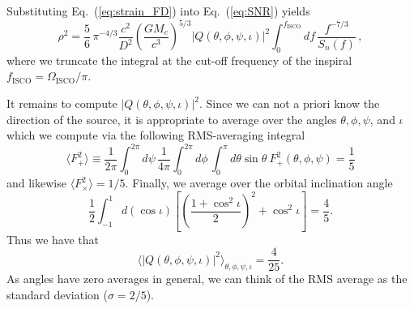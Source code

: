 \documentclass[prd,amsmath,amssymb,aps,floats,amsfonts,notitlepage,superscriptaddress,eqsecnum,nofootinbib,10pt]{revtex4-1}
\newcommand{\f}{\frac}
\newcommand{\be}{\begin{equation}}
\newcommand{\ee}{\end{equation}}
\begin{document}
Substituting Eq.~(\ref{eq:strain_FD}) into Eq.~(\ref{eq:SNR}) yields
%
\be
\rho^2 = \f{5}{6}\, \pi^{-4/3} \f{c^2}{D^2}\left(\f{G M_c}{c^3}\right)^{5/3}|Q(\theta,\phi,\psi,\iota)|^2 \int_0^{f_\text{ISCO}} d f\, \f{f^{-7/3}}{S_n(f)}\, \label{eq:SNR_v2},
\ee
%
where we truncate the integral at the cut-off frequency of the inspiral $f_\text{ISCO}=\Omega_\text{ISCO}/\pi$.

It remains to compute $|Q(\theta,\phi,\psi,\iota)|^2$. 
Since we can not a priori know the direction of the source, it is appropriate to average over the angles $\theta,\phi,\psi$, and $\iota$ which we compute
%
%
via the following RMS-averaging integral
%
\be
\langle F^2_{+}\rangle \equiv \f{1}{2\pi}\int_0^{2\pi}d\psi \,\f{1}{4\pi}\int_0^{2\pi} d\phi\,\int_0^\pi d\theta \sin\theta\ F^2_{+}(\theta,\phi,\psi)=\f{1}{5}\label{eq:ang_av}
\ee
%
and likewise $\langle F^2_{\times}\rangle=1/5 $.
Finally, we average over the orbital inclination angle
%
\be
\f{1}{2} \int_{-1}^1 d(\cos\iota)\left[\left(\f{1+\cos^2\iota}{2}\right)^2+\cos^2\iota\right] = \f{4}{5} .\label{eq:inc_ang_av}
\ee
Thus we have that
%
\be
\langle |Q(\theta,\phi,\psi,\iota)|^2 \rangle_{\theta,\phi,\psi,\iota} = \f{4}{25}\label{eq:RMS_th_ph_ps_iota}.
\ee
%
As angles have zero averages in general, we can think of the RMS average as the standard deviation ($\sigma =2/5$). 
%
%
%
%
%
\end{document}
